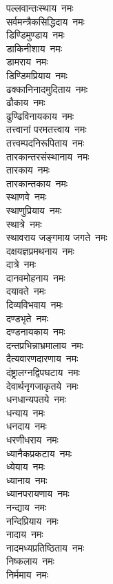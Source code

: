 \begin{multicols}{2}
\begin{flushleft}
पल्लवान्तःस्थाय~नमः\\
सर्वमन्त्रैकसिद्धिदाय~नमः\\
डिण्डिमुण्डाय~नमः\\
डाकिनीशाय~नमः\hfill{}\\
डामराय~नमः\\
डिण्डिमप्रियाय~नमः\\
ढक्कानिनादमुदिताय~नमः\\
ढौकाय~नमः\\
ढुण्ढिविनायकाय~नमः\\
तत्त्वानां परमतत्त्वाय~नमः\\
तत्त्वम्पदनिरूपिताय~नमः\\
तारकान्तरसंस्थानाय~नमः\\
तारकाय~नमः\\
तारकान्तकाय~नमः\hfill{}\\
स्थाणवे~नमः\\
स्थाणुप्रियाय~नमः\\
स्थात्रे~नमः\\
स्थावराय जङ्गमाय जगते~नमः\\
दक्षयज्ञप्रमथनाय~नमः\\
दात्रे~नमः\\
दानवमोहनाय~नमः\\
दयावते~नमः\\
दिव्यविभवाय~नमः\\
दण्डभृते~नमः\hfill{}\\
दण्डनायकाय~नमः\\
दन्तप्रभिन्नाभ्रमालाय~नमः\\
दैत्यवारणदारणाय~नमः\\
दंष्ट्रालग्नद्विपघटाय~नमः\\
देवार्थनृगजाकृतये~नमः\\
धनधान्यपतये~नमः\\
धन्याय~नमः\\
धनदाय~नमः\\
धरणीधराय~नमः\\
ध्यानैकप्रकटाय~नमः\hfill{}\\
ध्येयाय~नमः\\
ध्यानाय~नमः\\
ध्यानपरायणाय~नमः\\
नन्द्याय~नमः\\
नन्दिप्रियाय~नमः\\
नादाय~नमः\\
नादमध्यप्रतिष्ठिताय~नमः\\
निष्कलाय~नमः\\
निर्ममाय~नमः\\

\end{flushleft}
\end{multicols}
